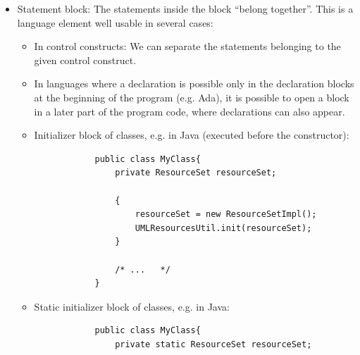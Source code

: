 \documentclass[margin=0px]{article}
\begin{document}
\begin{itemize}
\begin{itemize}
\begin{verbatim}
                doSomethingElse(j);
            }
            \end{verbatim}

              \item In this example \texttt{isOdd} is a function, with an \texttt{int} return value. It tells, about the parameter
                    integer x, whether it is odd. For this it ``ands'' x with 1 (0...01) using bitwise AND. If the result
                    is not 0, then it is odd, we return with the value true. Otherwise we continue operation, then return with the value false.
                    \begin{verbatim}
            int isOdd(int x)
            {
                if(x & 1) //bitwise AND with 0...01 is not 0...0
                    return true;

                return false;
            }
            \end{verbatim}
          \end{itemize}

    \item	Statement block: The statements inside the block ``belong together''.
          This is a language element well usable in several cases:
          \begin{itemize}
              \item	In control constructs: We can separate the statements belonging to the given control construct.

              \item	In languages where a declaration is possible only in the declaration
                    blocks at the beginning of the program (e.g. Ada), it is possible to open a
                    block in a later part of the program code, where declarations can also appear.

              \item	Initializer block of classes, e.g. in Java (executed before the constructor):
                    \begin{verbatim}
            public class MyClass{
                private ResourceSet resourceSet;

                {
                    resourceSet = new ResourceSetImpl();
                    UMLResourcesUtil.init(resourceSet);
                }

                /* ...   */
            }
            \end{verbatim}
              \item	Static initializer block of classes, e.g. in Java:
                    \begin{verbatim}
            public class MyClass{
                private static ResourceSet resourceSet;


\end{verbatim}
\end{itemize}
\end{itemize}
\end{document}
